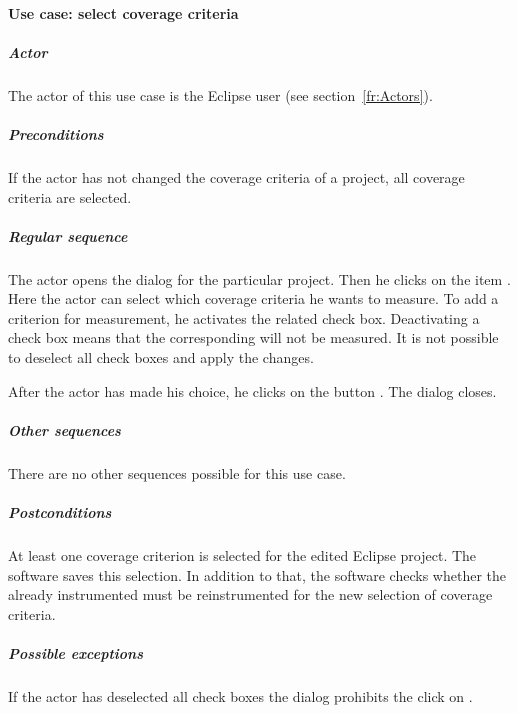 \paragraph{Use case: select coverage criteria}
\subparagraph{Actor}
The actor of this use case is the Eclipse user (see section~\ref{fr:Actors}).
\subparagraph{Preconditions}
If the actor has not changed the coverage criteria of a project, all coverage criteria are selected.
\subparagraph{Regular sequence}
The actor opens the  dialog for the particular project. Then he clicks on the item \eclui{\gbt}. Here the actor can select which coverage criteria he wants to measure. To add a criterion for measurement, he activates the related check box. Deactivating a check box means that the corresponding  will not be measured. It is not possible to deselect all check boxes and apply the changes.
\par
After the actor has made his choice, he clicks on the button . The dialog  closes.
\subparagraph{Other sequences}
There are no other sequences possible for this use case.
\subparagraph{Postconditions}
At least one coverage criterion is selected for the edited Eclipse project. The software saves this selection. In addition to that, the software checks whether the already instrumented  must be reinstrumented for the new selection of coverage criteria.
\subparagraph{Possible exceptions}
If the actor has deselected all check boxes the dialog prohibits the click on .

